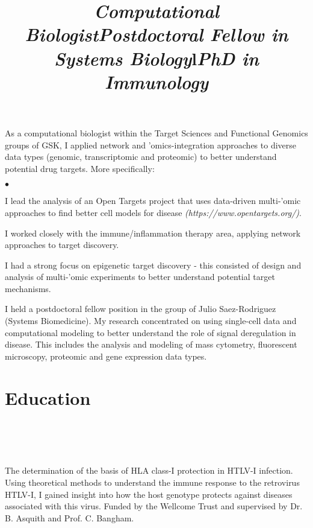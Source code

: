 \documentclass[overlapped, line, 11pt, letterpaper]{res}
\renewenvironment{itemize}{
\begin{list}{$\bullet$}
{\setlength{\itemsep}{0cm}}
}{\end{list}}
\begin{document}
\begin{resume}
\title{\it Computational Biologist} 
\begin{position}
As a computational biologist within the Target Sciences and Functional Genomics groups of GSK, I applied network and 'omics-integration approaches to diverse data types (genomic, transcriptomic and proteomic) to better understand potential drug targets. More specifically:
\begin{itemize}
\item I lead the analysis of an Open Targets project that uses data-driven multi-'omic approaches to find better cell models for disease \emph{(https://www.opentargets.org/)}.
\item I worked closely with the immune/inflammation therapy area, applying network approaches to target discovery.
\item I had a strong focus on epigenetic target discovery - this consisted of design and analysis of multi-'omic experiments to better understand potential target mechanisms.
\end{itemize}
\end{position}

\title{\it Postdoctoral Fellow in Systems Biology} 
\begin{position}
I held a postdoctoral fellow position in the group of Julio Saez-Rodriguez (Systems Biomedicine). My research concentrated on using single-cell data and computational modeling to better understand the role of signal deregulation in disease. This includes the analysis and modeling of mass cytometry, fluorescent microscopy, proteomic and gene expression data types.
\end{position}

\section{\bf Education}
\begin{formatb}
\title{l} \\
\\
\body \\
\end{formatb}

\title{\it PhD in Immunology} 
\begin{position}
The determination of the basis of HLA class-I protection in HTLV-I infection. Using theoretical methods to understand the immune response to the retrovirus HTLV-I, I gained insight into how the host genotype protects against diseases associated with this virus. Funded by the Wellcome Trust and supervised by Dr. B. Asquith and Prof. C. Bangham.
\end{position}


\end{resume}
\end{document}
